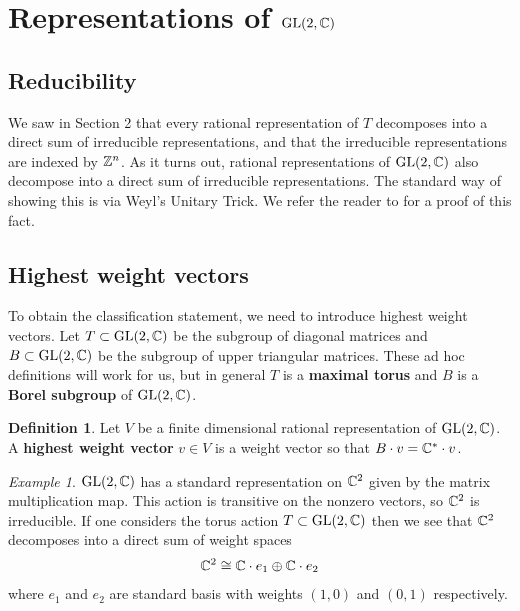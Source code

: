 \documentclass{amsart}
\numberwithin{equation}{section}
\theoremstyle{plain} %
\theoremstyle{definition}
\newtheorem{definition}[equation]{Definition}
\theoremstyle{remark}
\newtheorem{example}[equation]{Example}
\begin{document}
\section{Representations of $\operatorname{GL}(2,\mathbb{C})$}

\subsection{Reducibility}
We saw in Section 2 that every rational representation of $T$ decomposes into a direct sum of irreducible representations,
and that the irreducible representations are indexed by $\mathbb{Z}^n$. As it turns out, rational representations of $\operatorname{GL}(2,\mathbb{C})$
also decompose into a direct sum of irreducible representations. The standard way of showing this is via 
Weyl's Unitary Trick. We refer the reader to \cite{milne} for a proof of this fact.


\subsection{Highest weight vectors}
To obtain the classification statement, we need to introduce highest weight vectors.
Let $T\subset \operatorname{GL}(2,\mathbb{C})$ be the subgroup of diagonal matrices and $B \subset \operatorname{GL}(2,\mathbb{C})$ be the subgroup of upper triangular matrices.
These ad hoc definitions will work for us, but in general $T$ is a \textbf{maximal torus} and $B$ is a \textbf{Borel subgroup} of $\operatorname{GL}(2,\mathbb{C})$.
\begin{definition}
    Let $V$ be a finite dimensional rational representation of $\operatorname{GL}(2,\mathbb{C})$. A \textbf{highest weight vector} $v\in V$ is 
    a weight vector so that $B\cdot v = \mathbb{C}^*\cdot v$. 
\end{definition}



\begin{example}
$\operatorname{GL}(2,\mathbb{C})$ has a standard representation on $\mathbb{C}^2$ given by the matrix multiplication map. This action
is transitive on the nonzero vectors, so $\mathbb{C}^2$ is irreducible. If one considers the torus action $T\subset \operatorname{GL}(2,\mathbb{C})$
then we see that $\mathbb{C}^2$ decomposes into a direct sum of weight spaces \begin{align*}
    \mathbb{C}^2 \cong \mathbb{C}\cdot e_1 \oplus \mathbb{C}\cdot e_2
\end{align*} where $e_1$ and $e_2$ are standard basis with weights $(1,0)$ and $(0,1)$ respectively.
\end{example}
\end{document}
